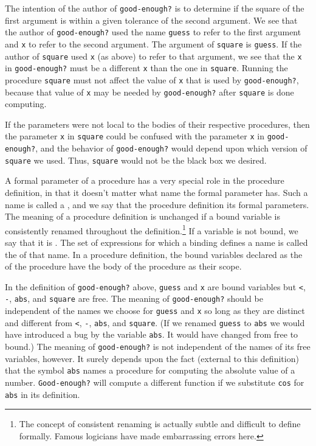 The intention of the author of \texttt{good-enough?} is to determine if
the square of the first argument is within a given tolerance of the
second argument.  We see that the author of \texttt{good-enough?} used
the name \texttt{guess} to refer to the first argument and \texttt{x} to
refer to the second argument.  The argument of \texttt{square} is \texttt{guess}.  If the author of \texttt{square} used \texttt{x} (as above)
to refer to that argument, we see that the \texttt{x} in \texttt{good-enough?} must be a different \texttt{x} than the one in \texttt{square}.  Running the procedure \texttt{square} must not affect the value
of \texttt{x} that is used by \texttt{good-enough?}, because that value of
\texttt{x} may be needed by \texttt{good-enough?} after \texttt{square} is done
computing.

If the parameters were not local to the bodies of their respective
procedures, then the parameter \texttt{x} in \texttt{square} could be
confused with the parameter \texttt{x} in \texttt{good-enough?}, and the
behavior of \texttt{good-enough?} would depend upon which version of
\texttt{square} we used.  Thus, \texttt{square} would not be the black box
we desired.

A formal parameter of a procedure has a very special role in the
procedure definition, in that it doesn't matter what name the formal
parameter has.  Such a name is called a , and we
say that the procedure definition  its formal parameters.
The meaning of a procedure definition is unchanged if a bound variable
is consistently renamed throughout the definition.\footnote{The
concept of consistent renaming is actually subtle and difficult to
define formally.  Famous logicians have made embarrassing errors
here.}  If a variable is not bound, we say that it is .  The
set of expressions for which a binding defines a name is called the
 of that name.
In a procedure definition, the bound variables
declared as the  of the procedure have the body of
the procedure as their scope.

In the definition of \texttt{good-enough?} above, \texttt{guess} and \texttt{x} are
bound variables but \texttt{<}, \texttt{-}, \texttt{abs}, and \texttt{square} are free.
The meaning of \texttt{good-enough?} should be independent of the names we
choose for \texttt{guess} and \texttt{x} so long as they are distinct and
different from \texttt{<}, \texttt{-}, \texttt{abs}, and \texttt{square}.  (If we renamed
\texttt{guess} to \texttt{abs} we would have introduced a bug by 
the variable \texttt{abs}.  It would have changed from free to bound.)  The
meaning of \texttt{good-enough?} is not independent of the names of its
free variables, however.  It surely depends upon the fact (external to
this definition) that the symbol \texttt{abs} names a procedure for
computing the absolute value of a number.  \texttt{Good-enough?} will
compute a different function if we substitute \texttt{cos} for \texttt{abs} in
its definition.

